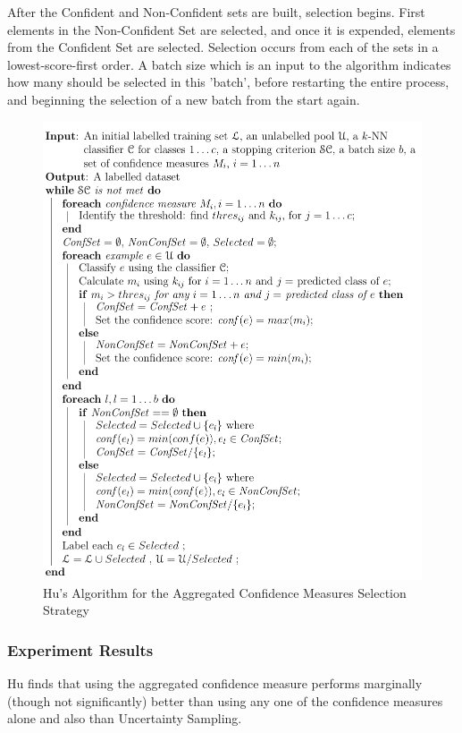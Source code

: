 \documentclass[a4paper,11pt]{report}
\begin{document}
After the Confident and Non-Confident sets are built, selection begins. First elements in the Non-Confident Set are selected, and once it is expended, elements from the Confident Set are selected. Selection occurs from each of the sets in a lowest-score-first order. A batch size which is an input to the algorithm indicates how many should be selected in this 'batch', before restarting the entire process, and beginning the selection of a new batch from the start again.

\begin{figure}[h!]
\includegraphics{./Others/Hu2011AggregrateAlgorithm}
\caption{Hu's Algorithm for the Aggregated Confidence Measures Selection Strategy}
\end{figure}

\subsubsection{Experiment Results}
Hu finds that using the aggregated confidence measure performs marginally (though not significantly) better than using any one of the confidence measures alone and also than Uncertainty Sampling.
\end{document}
